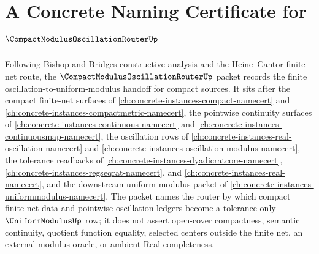 \chapter{A Concrete Naming Certificate for $\CompactModulusOscillationRouterUp$}
\label{ch:concrete-instances-compact-modulus-oscillation-router-namecert}

Following Bishop and Bridges constructive analysis and the Heine--Cantor finite-net route, the $\CompactModulusOscillationRouterUp$ packet records the finite oscillation-to-uniform-modulus handoff for compact sources. It sits after the compact finite-net surfaces of \autoref{ch:concrete-instances-compact-namecert} and \autoref{ch:concrete-instances-compactmetric-namecert}, the pointwise continuity surfaces of \autoref{ch:concrete-instances-continuous-namecert} and \autoref{ch:concrete-instances-continuousmap-namecert}, the oscillation rows of \autoref{ch:concrete-instances-real-oscillation-namecert} and \autoref{ch:concrete-instances-oscillation-modulus-namecert}, the tolerance readbacks of \autoref{ch:concrete-instances-dyadicratcore-namecert}, \autoref{ch:concrete-instances-regseqrat-namecert}, and \autoref{ch:concrete-instances-real-namecert}, and the downstream uniform-modulus packet of \autoref{ch:concrete-instances-uniformmodulus-namecert}. The packet names the router by which compact finite-net data and pointwise oscillation ledgers become a tolerance-only $\UniformModulusUp$ row; it does not assert open-cover compactness, semantic continuity, quotient function equality, selected centers outside the finite net, an external modulus oracle, or ambient Real completeness.

